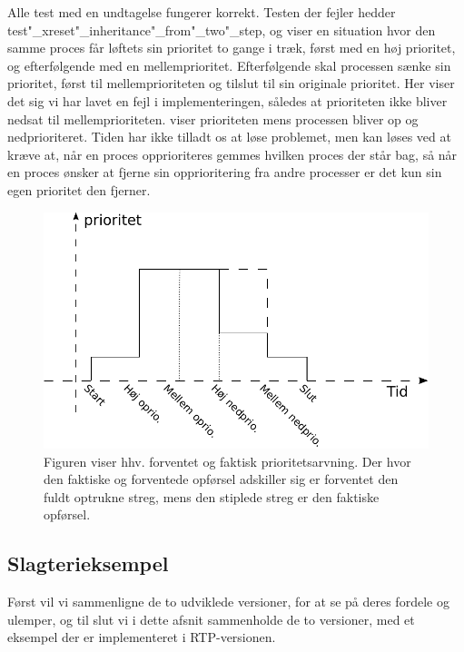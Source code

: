  Alle test med en undtagelse fungerer korrekt. Testen der fejler hedder test"_xreset"_inheritance"_from"_two"_step, og viser en situation hvor den samme proces får løftets sin prioritet to gange i træk, først med en høj prioritet, og efterfølgende med en mellemprioritet. Efterfølgende skal processen sænke sin prioritet, først til  mellemprioriteten og tilslut til sin originale prioritet. Her viser det sig vi har lavet en fejl i implementeringen, således at prioriteten ikke bliver nedsat til mellemprioriteten.  viser prioriteten mens processen bliver op og nedprioriteret. Tiden har ikke tilladt os at løse problemet, men  kan løses ved at kræve at, når en proces opprioriteres gemmes hvilken proces der står bag, så når en proces ønsker at fjerne sin opprioritering fra andre processer er det kun sin egen  prioritet den fjerner.  
 
  
\begin{figure}
 \begin{center}
  \includegraphics[scale=1]{images/priority-inheritance}
	\caption{Figuren viser hhv. forventet og faktisk prioritetsarvning. Der hvor den faktiske og forventede opførsel adskiller sig er forventet den fuldt optrukne streg, mens den stiplede streg er den faktiske opførsel.}
	\label{fig:priority-inheritance}
\end{center}
\end{figure}
  

\subsection{Slagterieksempel}

Først vil vi sammenligne de to udviklede versioner, for at se på deres fordele og ulemper, og til slut vi i dette afsnit sammenholde de to versioner, med et  eksempel der er implementeret i RTP-versionen.

